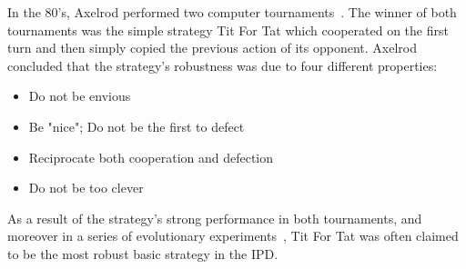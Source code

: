 \documentclass{article}
\begin{document}
In the 80's, Axelrod performed two computer tournaments~\cite{Axelrod1980a,
Axelrod1980b}. The
winner of both tournaments was the simple strategy Tit For Tat which cooperated
on the first turn and then simply copied the previous action of its opponent.
Axelrod concluded that the strategy's robustness was due to four different
properties:

\begin{itemize}
    \item Do not be envious
    \item Be "nice"; Do not be the first to defect
    \item Reciprocate both cooperation and defection
    \item Do not be too clever
\end{itemize}

As a result of the strategy's strong performance in both tournaments, and moreover in a
series of evolutionary experiments~\cite{Axelrod1981}, Tit For Tat was often
claimed to be the most robust basic strategy in the IPD. 
\end{document}
